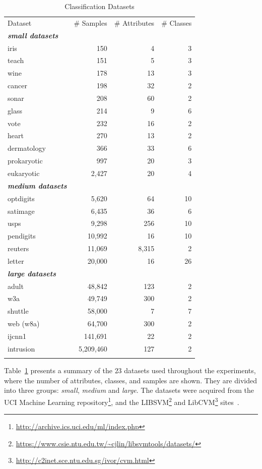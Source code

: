 \documentclass[reqno]{vcuthesis}
\numberwithin{equation}{chapter}
\begin{document}
\begin{table}[t!]
\caption{Classification Datasets}
\footnotesize
\centering
\label{tab:ollawvDataset}
\begin{tabularx}{0.7\textwidth}{l@{\extracolsep{\fill}}rrr}
\hline\noalign{\smallskip}
Dataset & \# Samples & \# Attributes & \# Classes \\
\noalign{\smallskip}\hline\noalign{\smallskip}
\textbf{\textit{small datasets}} & \\
iris & 150 & 4 &  3  \\ 
teach & 151 & 5 &  3  \\ 
wine & 178 & 13 &  3  \\ 
cancer & 198 & 32 &  2  \\ 
sonar & 208 & 60 &  2  \\ 
glass & 214 & 9 &  6  \\ 
vote & 232 & 16 &  2  \\ 
heart & 270 & 13 &  2  \\ 
dermatology & 366 & 33 &  6  \\ 
prokaryotic & 997 & 20 &  3  \\ 
eukaryotic & 2,427 & 20 &  4  \\ 
\textbf{\textit{medium datasets}} & \\
optdigits & 5,620 & 64 &  10  \\ 
satimage & 6,435 & 36 &  6  \\ 
usps & 9,298 & 256 &  10  \\ 
pendigits & 10,992 & 16 &  10  \\ 
reuters & 11,069 & 8,315 &  2  \\ 
letter & 20,000 & 16 &  26  \\ 
\textbf{\textit{large datasets}} & \\
adult & 48,842 & 123 &  2  \\ 
w3a & 49,749 & 300 &  2  \\ 
shuttle & 58,000 & 7 &  7  \\ 
web (w8a) & 64,700 & 300 &  2  \\ 
ijcnn1 & 141,691 & 22 &  2  \\ 
intrusion & 5,209,460 & 127 &  2  \\  
\noalign{\smallskip}\hline
\end{tabularx}
\end{table}

Table~\ref{tab:ollawvDataset} presents a summary of the $23$ datasets used throughout the experiments, where the number of attributes, classes, and samples are shown. They are divided into three groups: \textit{small}, \textit{medium} and \textit{large}. The datasets were acquired from the UCI Machine Learning repository\footnote{\url{http://archive.ics.uci.edu/ml/index.php}}, and the LIBSVM\footnote{\url{https://www.csie.ntu.edu.tw/~cjlin/libsvmtools/datasets/}} and LibCVM\footnote{\url{http://c2inet.sce.ntu.edu.sg/ivor/cvm.html}} sites~\cite{Lichman:2013,CC01a,tsang2005core}. 
\end{document}
